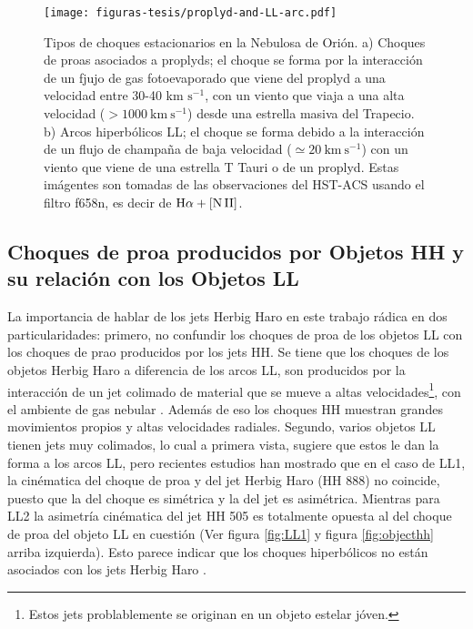 \begin{figure}
  \centering
  \texttt{[image: figuras-tesis/proplyd-and-LL-arc.pdf]}
  \caption{Tipos de choques estacionarios en la Nebulosa de Orión. a) Choques de proas asociados a proplyds; el choque se forma por la interacción de un fjujo de gas fotoevaporado que viene del proplyd a una velocidad entre 30-40 km \(\text{s}^{-1}\), con un viento que viaja a una alta velocidad (\(>1000 ~\text{km} ~\text{s}^{-1}\)) desde una estrella masiva del Trapecio. b) Arcos hiperbólicos LL; el choque se forma debido a la interacción de un flujo de champaña de baja velocidad (\(\simeq 20~\text{km} ~\text{s}^{-1}\)) con un viento que viene de una estrella T Tauri o de un proplyd. Estas imágentes son tomadas de las observaciones del HST-ACS usando el filtro f658n, es decir de \(\mathrm{H}\alpha + \mathrm{[N\,II]}\). }
  \label{fig:proplydbow-objetoll}
\end{figure}

\subsection{Choques de proa producidos por  Objetos HH y su relación con los Objetos LL}
\label{sec:herbig}

La importancia de hablar de los jets Herbig Haro en este trabajo rádica en dos particularidades: primero, no confundir los choques de proa de los objetos LL con los choques de prao producidos por los jets HH. Se tiene que los choques de los objetos Herbig Haro a diferencia de los arcos LL, son producidos por la interacción de un jet colimado de material que se mueve a altas velocidades\footnote{Estos jets problablemente se originan en un objeto estelar jóven.}, con el ambiente de gas nebular \citep{Odell:1994}. Además de eso los choques HH muestran grandes movimientos propios y altas velocidades radiales. Segundo, varios objetos LL tienen jets muy colimados, lo cual a primera vista, sugiere que estos le dan la forma a los arcos LL, pero recientes estudios han mostrado que en el caso de LL1, la cinématica del choque de proa y del jet Herbig Haro (HH 888) no coincide, puesto que la del choque es simétrica y la del jet es asimétrica. Mientras para LL2 la asimetría cinématica del jet HH 505 es totalmente opuesta al del choque de proa del objeto LL en cuestión (Ver figura \ref{fig:LL1} y figura \ref{fig:objecthh} arriba izquierda). Esto parece indicar que los choques hiperbólicos no están asociados con los jets Herbig Haro \citep{Henney:2013a}. 

